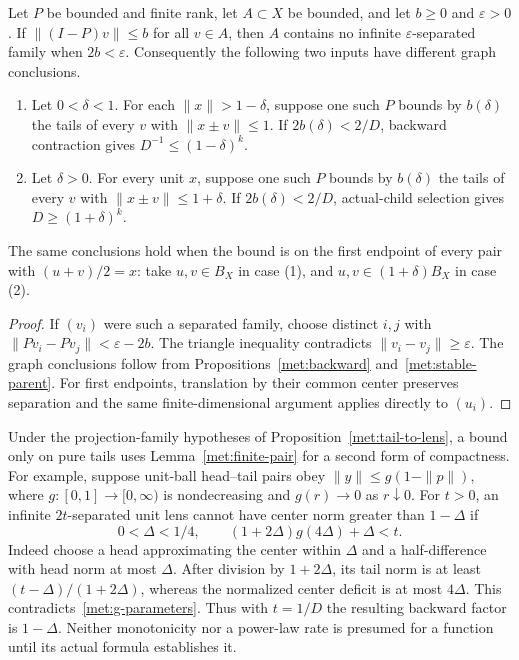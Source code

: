 \begin{lemma}\label{met:packing}
Let $P$ be bounded and finite rank, let $A\subset X$ be bounded,
and let $b\ge0$ and $\varepsilon>0$.
If $\|(I-P)v\|\le b$ for all $v\in A$, then $A$ contains no infinite
$\varepsilon$-separated family when $2b<\varepsilon$.
Consequently the following two inputs have different graph conclusions.
\begin{enumerate}
\item Let $0<\delta<1$. For each $\|x\|>1-\delta$, suppose one such $P$ bounds by
$b(\delta)$ the tails of every $v$ with $\|x\pm v\|\le1$.
If $2b(\delta)<2/D$, backward contraction gives
$D^{-1}\le(1-\delta)^k$.
\item Let $\delta>0$. For every unit $x$, suppose one such $P$ bounds by
$b(\delta)$ the tails of every $v$ with $\|x\pm v\|\le1+\delta$.
If $2b(\delta)<2/D$, actual-child selection gives
$D\ge(1+\delta)^k$.
\end{enumerate}
The same conclusions hold when the bound is on the first endpoint of
every pair with $(u+v)/2=x$: take $u,v\in B_X$ in case (1), and
$u,v\in(1+\delta)B_X$ in case (2).
\end{lemma}
\begin{proof}
If $(v_i)$ were such a separated family, choose distinct $i,j$ with
$\|Pv_i-Pv_j\|<\varepsilon-2b$. The triangle inequality contradicts
$\|v_i-v_j\|\ge\varepsilon$. The graph conclusions follow from
Propositions~\ref{met:backward} and~\ref{met:stable-parent}. For first
endpoints, translation by their common center preserves separation and
the same finite-dimensional argument applies directly to $(u_i)$.
\end{proof}

Under the projection-family hypotheses of Proposition~\ref{met:tail-to-lens},
a bound only on pure tails uses Lemma~\ref{met:finite-pair} for a
second form of compactness. For example, suppose unit-ball
head--tail pairs obey $\|y\|\le g(1-\|p\|)$, where
$g:[0,1]\to[0,\infty)$ is nondecreasing and $g(r)\to0$ as
$r\downarrow0$. For $t>0$, an infinite
$2t$-separated unit lens cannot have center norm greater than $1-\Delta$
if
\begin{equation}\label{met:g-parameters}
 0<\Delta<1/4,\qquad (1+2\Delta)g(4\Delta)+\Delta<t.
\end{equation}
Indeed choose a head approximating the center within $\Delta$ and a
half-difference with head norm at most $\Delta$. After division by
$1+2\Delta$, its tail norm is at least $(t-\Delta)/(1+2\Delta)$,
whereas the normalized center deficit is at most $4\Delta$. This
contradicts~\eqref{met:g-parameters}. Thus with $t=1/D$ the resulting
backward factor is $1-\Delta$. Neither monotonicity nor a power-law rate
is presumed for a function until its actual formula establishes it.

